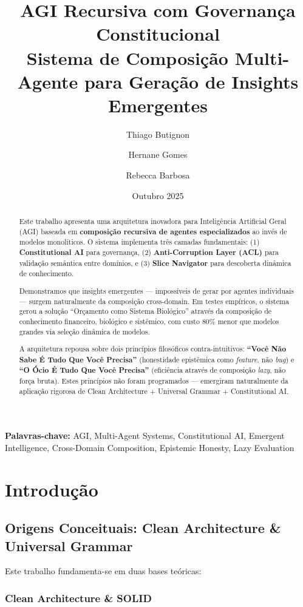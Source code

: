 \documentclass[11pt]{article}
\title{\textbf{AGI Recursiva com Governança Constitucional}\\
\large Sistema de Composição Multi-Agente para Geração de Insights Emergentes}
\author{
    Thiago Butignon
    \and
    Hernane Gomes
    \and
    Rebecca Barbosa
}
\date{Outubro 2025}
\begin{document}
\maketitle

\begin{abstract}
Este trabalho apresenta uma arquitetura inovadora para Inteligência Artificial Geral (AGI) baseada em \textbf{composição recursiva de agentes especializados} ao invés de modelos monolíticos. O sistema implementa três camadas fundamentais: (1) \textbf{Constitutional AI} para governança, (2) \textbf{Anti-Corruption Layer (ACL)} para validação semântica entre domínios, e (3) \textbf{Slice Navigator} para descoberta dinâmica de conhecimento.

Demonstramos que insights emergentes --- impossíveis de gerar por agentes individuais --- surgem naturalmente da composição cross-domain. Em testes empíricos, o sistema gerou a solução ``Orçamento como Sistema Biológico'' através da composição de conhecimento financeiro, biológico e sistêmico, com custo 80\% menor que modelos grandes via seleção dinâmica de modelos.

A arquitetura repousa sobre dois princípios filosóficos contra-intuitivos: \textbf{``Você Não Sabe É Tudo Que Você Precisa''} (honestidade epistêmica como \textit{feature}, não \textit{bug}) e \textbf{``O Ócio É Tudo Que Você Precisa''} (eficiência através de composição \textit{lazy}, não força bruta). Estes princípios não foram programados --- emergiram naturalmente da aplicação rigorosa de Clean Architecture + Universal Grammar + Constitutional AI.
\end{abstract}

\noindent\textbf{Palavras-chave:} AGI, Multi-Agent Systems, Constitutional AI, Emergent Intelligence, Cross-Domain Composition, Epistemic Honesty, Lazy Evaluation

\section{Introdução}

\subsection{Origens Conceituais: Clean Architecture \& Universal Grammar}

Este trabalho fundamenta-se em duas bases teóricas:

\subsubsection{Clean Architecture \& SOLID}
\end{document}
